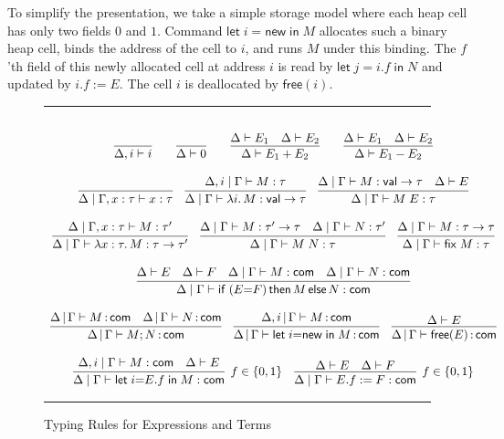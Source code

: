 \documentclass{LMCS}
\newcommand{\val}{\mathsf{val}}
\newcommand{\com}{\mathsf{com}}
\newcommand{\new}{\mathsf{new}}
\newcommand{\free}{\mathsf{free}}
\newcommand{\ifz}{\mathsf{if}}
\newcommand{\fix}{\mathsf{fix}}
\newcommand{\mletin}[2]{\mathsf{let}\;{#1}\;\mathsf{in}\;{#2}}
\newcommand{\then}{\mathsf{then}}
\newcommand{\melse}{\mathsf{else}}
\begin{document}
To simplify the presentation, we take a simple storage
model where each heap cell has only two fields $0$ and $1$.
Command 
$\mletin{i{=}\new}{M}$ allocates such a binary heap cell, binds the 
address of the cell to $i$, and runs $M$ under this binding.
The $f$'th field of this newly allocated cell at address $i$ is read by
$\mletin{j=i.f}{N}$ and updated by
$i.f:=E$. The cell $i$ is deallocated by $\free(i)$.

\begin{figure*}[t]
\hrule
$\,$

$$
\begin{array}{c}
\infer{
  \Delta, i \vdash i
}{}
\qquad
\infer{\Delta \vdash 0}{}
\qquad
\infer{
\Delta \vdash E_1 + E_2
}{
\Delta \vdash E_1 &
\Delta \vdash E_2}
\qquad
\infer{
\Delta \vdash E_1 - E_2
}{
\Delta \vdash E_1 &
\Delta \vdash E_2
}
\\
\\
\infer{
  \Delta \mid \Gamma,x : \tau \vdash x : \tau
}{}
\quad
\infer{
  \Delta \mid \Gamma \vdash 
  \lambda i.\, M : \val \rightarrow \tau
}{
  \Delta, i \mid \Gamma \vdash M : \tau
}
\quad
\infer{
  \Delta \mid \Gamma \vdash 
  M\;E : \tau
}{
  \Delta \mid \Gamma \vdash M : \val \rightarrow \tau
  &
  \Delta \vdash E
}
\\
\\
\infer{
  \Delta \mid \Gamma 
  \vdash \lambda x : \tau.\, M : \tau \rightarrow \tau'
}{ 
  \Delta \mid \Gamma, x : \tau 
   \vdash M : \tau'
}
\quad
\infer{
  \Delta \mid \Gamma \vdash M\;N : \tau
}{ 
  \Delta \mid \Gamma \vdash M : \tau' \rightarrow \tau
  &
  \Delta \mid \Gamma \vdash N : \tau'
}
\quad
\infer{
  \Delta \mid \Gamma \vdash \fix\;M : \tau
}{
  \Delta \mid \Gamma \vdash M : \tau \rightarrow \tau
}
\\
\\
\infer{
  \Delta \mid \Gamma \vdash \ifz\;(E{=}F)\,\then\,M\,\melse\,N : \com
}{
  \Delta \vdash E
  &
  \Delta \vdash F
  &
  \Delta \mid \Gamma \vdash M : \com
  &
  \Delta \mid \Gamma \vdash N : \com
}
\\
\\
\infer{
  \Delta \,|\, \Gamma \vdash M;N \,{:}\, \com
}{
  \Delta \,|\, \Gamma \vdash M \,{:}\, \com
  &
  \Delta \,|\, \Gamma \vdash N \,{:}\, \com
}
\quad
\infer{
  \Delta \,|\, \Gamma \vdash \mletin{i{=}\new}{M} \,{:}\, \com
}{
  \Delta,i \,|\, \Gamma \vdash M \,{:}\, \com
}
\quad
\infer{
  \Delta \,|\, \Gamma \vdash {\free(E)} \,{:}\, \com
}{
  \Delta \vdash E
}
\\
\\
\infer[f\in\{0,1\}]{
  \Delta \mid \Gamma \vdash \mletin{i{=}E.f}{M} : \com
}{
  \Delta,i \mid \Gamma \vdash M : \com
  &
  \Delta \vdash E
}
\quad
\infer[f \in \{0,1\}]{
  \Delta \mid \Gamma \vdash {E.f:=F} : \com
}{
  \Delta \vdash E 
  &
  \Delta \vdash F
}
\end{array}
$$
\hrule
\caption{Typing Rules for Expressions and Terms}
\label{fig:typing}
\end{figure*}
\end{document}
